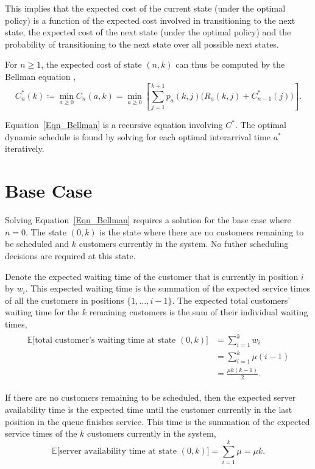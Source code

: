 This implies that the expected cost of the current state (under the optimal policy) is a function of the expected cost involved in transitioning to the next state, the expected cost of the next state (under the optimal policy) and the probability of transitioning to the next state over all possible next states.

For $n \geq 1$, the expected cost of state $(n, k)$ can thus be computed by the Bellman equation \citep{Bellman},
\begin{equation}
	C_{n}^{*} (k) \coloneqq \min_{a \geq 0} C_{n} (a, k) = \min_{a \geq 0} \left[ \sum_{j = 1}^{k + 1} p_{a} (k, j) \Big( R_{a} (k, j) + C_{n - 1}^{*} (j) \Big) \right].
	\label{Eqn_Bellman}
\end{equation}

Equation~\ref{Eqn_Bellman} is a recursive equation involving $C^{*}$. The optimal dynamic schedule is found by solving for each optimal interarrival time $a^{*}$ iteratively.

\section{Base Case}
Solving Equation~\ref{Eqn_Bellman} requires a solution for the base case where $n = 0$. The state $(0, k)$ is the state where there are no customers remaining to be scheduled and $k$ customers currently in the system. No futher scheduling decisions are required at this state.

Denote the expected waiting time of the customer that is currently in position $i$ by $w_{i}$. This expected waiting time is the summation of the expected service times of all the customers in positions $\{ 1, \ldots, i - 1 \}$. The expected total customers' waiting time for the $k$ remaining customers is the sum of their individual waiting times,
\begin{align}
	\begin{split}
		\mathbb{E} \Big[\text{total customer's waiting time at state $(0, k)$} \Big] & = \sum_{i = 1}^{k} w_{i} \\
		& = \sum_{i = 1}^{k} \mu (i - 1) \\
		& = \frac{\mu k (k - 1)}{2}.
	\end{split}
\end{align}

If there are no customers remaining to be scheduled, then the expected server availability time is the expected time until the customer currently in the last position in the queue finishes service. This time is the summation of the expected service times of the $k$ customers currently in the system,
\begin{equation}
	\mathbb{E} \Big[\text{server availability time at state $(0, k)$} \Big] = \sum_{i = 1}^{k} \mu = \mu k.
\end{equation}

